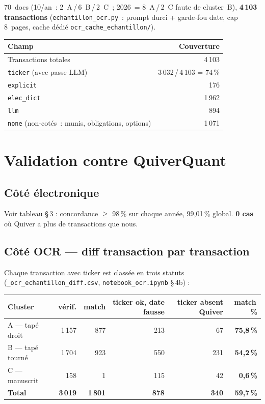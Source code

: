 \documentclass[11pt,a4paper]{article}
\newcommand{\file}[1]{\texttt{\small #1}}
\begin{document}
70~docs (10/an~: 2~A\,/\,6~B\,/\,2~C~; 2026~= 8~A\,/\,2~C faute de cluster~B),
\textbf{4\,103 transactions} (\file{echantillon\_ocr.py}~: prompt durci + garde-fou date,
cap 8~pages, cache dédié \file{ocr\_cache\_echantillon/}).

\begin{center}
\begin{tabular}{@{}l r@{}}
\toprule
\textbf{Champ} & \textbf{Couverture} \\
\midrule
Transactions totales & 4\,103 \\
\texttt{ticker} (avec passe LLM) & 3\,032\,/\,4\,103 = 74\,\% \\
\quad \texttt{explicit} & 176 \\
\quad \texttt{elec\_dict} & 1\,962 \\
\quad \texttt{llm} & 894 \\
\quad \texttt{none} (non-cotés~: munis, obligations, options) & 1\,071 \\
\bottomrule
\end{tabular}
\end{center}

\section{Validation contre QuiverQuant}

\subsection*{Côté électronique}

Voir tableau §\,3 : concordance $\ge$ 98\,\% sur chaque année, 99,01\,\% global.
\textbf{0 cas} où Quiver a plus de transactions que nous.

\subsection*{Côté OCR --- diff transaction par transaction}

Chaque transaction avec ticker est classée en trois statuts
(\file{\_ocr\_echantillon\_diff.csv}, \file{notebook\_ocr.ipynb} §\,4b) :

\begin{center}
\begin{tabular}{@{}l r r r r r@{}}
\toprule
\textbf{Cluster} & \textbf{vérif.} & \textbf{match} & \textbf{ticker ok, date fausse}
  & \textbf{ticker absent Quiver} & \textbf{match\,\%} \\
\midrule
A --- tapé droit  & 1\,157 &   877 & 213 &  67 & \textbf{75,8\,\%} \\
B --- tapé tourné & 1\,704 &   923 & 550 & 231 & \textbf{54,2\,\%} \\
C --- manuscrit   &    158 &     1 & 115 &  42 &  \textbf{0,6\,\%} \\
\midrule
\textbf{Total}    & \textbf{3\,019} & \textbf{1\,801} & \textbf{878}
  & \textbf{340} & \textbf{59,7\,\%} \\
\bottomrule
\end{tabular}
\end{center}
\end{document}
